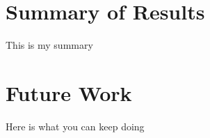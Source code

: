 \section{Summary of Results}

This is my summary

\section{Future Work}

Here is what you can keep doing
